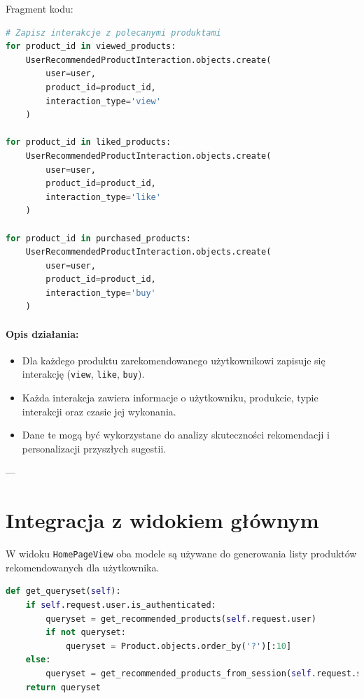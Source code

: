 \documentclass[12pt,a4paper,oneside]{article}
\theoremstyle{definition}
\numberwithin{equation}{section}
\begin{document}
Fragment kodu:

\begin{lstlisting}[language=Python]
# Zapisz interakcje z polecanymi produktami
for product_id in viewed_products:
    UserRecommendedProductInteraction.objects.create(
        user=user,
        product_id=product_id,
        interaction_type='view'
    )

for product_id in liked_products:
    UserRecommendedProductInteraction.objects.create(
        user=user,
        product_id=product_id,
        interaction_type='like'
    )

for product_id in purchased_products:
    UserRecommendedProductInteraction.objects.create(
        user=user,
        product_id=product_id,
        interaction_type='buy'
    )
\end{lstlisting}

\paragraph{Opis działania:}
\begin{itemize}
    \item Dla każdego produktu zarekomendowanego użytkownikowi zapisuje się interakcję (\texttt{view}, \texttt{like}, \texttt{buy}).
    \item Każda interakcja zawiera informacje o użytkowniku, produkcie, typie interakcji oraz czasie jej wykonania.
    \item Dane te mogą być wykorzystane do analizy skuteczności rekomendacji i personalizacji przyszłych sugestii.
\end{itemize}

---

\section{Integracja z widokiem głównym}
W widoku \texttt{HomePageView} oba modele są używane do generowania listy produktów rekomendowanych dla użytkownika.

\begin{lstlisting}[language=Python]
def get_queryset(self):
    if self.request.user.is_authenticated:
        queryset = get_recommended_products(self.request.user)
        if not queryset:
            queryset = Product.objects.order_by('?')[:10]
    else:
        queryset = get_recommended_products_from_session(self.request.session)
    return queryset
\end{lstlisting}
\end{document}
